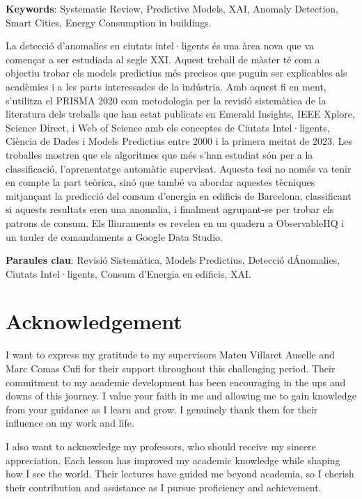 \documentclass[a4paper,12pt,twoside]{ThesisStyle}
\begin{document}
\vspace{5mm} 
\textbf{Keywords}: Systematic Review, Predictive Models, XAI, Anomaly Detection, Smart Cities, Energy Consumption in buildings.

\vspace{10mm} 

La detecció d'anomalies en ciutats intel·ligents és una àrea nova que va començar a ser estudiada al segle XXI. Aquest treball de màster té com a objectiu trobar els models predictius més precisos que puguin ser explicables als acadèmics i a les parts interessades de la indústria. Amb aquest fi en ment, s'utilitza el PRISMA 2020 com metodologia per la revisió sistemàtica de la literatura dels treballs que han estat publicats en Emerald Insights, IEEE Xplore, Science Direct, i Web of Science amb els conceptes de Ciutats Intel·ligents, Ciència de Dades i Models Predictius entre 2000 i la primera meitat de 2023. Les troballes mostren que els algoritmes que més s'han estudiat són per a la classificació, l'aprenentatge automàtic supervisat. Aquesta tesi no només va tenir en compte la part teòrica, sinó que també va abordar aquestes tècniques mitjançant la predicció del consum d'energia en edificis de Barcelona, classificant si aquests resultats eren una anomalia, i finalment agrupant-se per trobar els patrons de consum. Els lliuraments es revelen en un quadern a ObservableHQ i un tauler de comandaments a Google Data Studio.

\vspace{5mm} 
\textbf{Paraules clau}: Revisió Sistemàtica, Models Predictius, Detecció d\'Anomalies, Ciutats Intel·ligents, Consum d'Energia en edificis, XAI.

\chapter*{Acknowledgement}

I want to express my gratitude to my supervisors Mateu Villaret Auselle and Marc Comas Cufi for their support throughout this challenging period. Their commitment to my academic development has been encouraging in the ups and downs of this journey. I value your faith in me and allowing me to gain knowledge from your guidance as I learn and grow. I genuinely thank them for their influence on my work and life.

I also want to acknowledge my professors, who should receive my sincere appreciation. Each lesson has improved my academic knowledge while shaping how I see the world. Their lectures have guided me beyond academia, so I cherish their contribution and assistance as I pursue proficiency and achievement.
\end{document}
